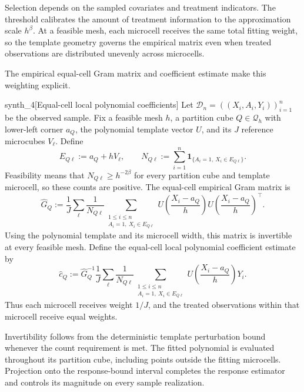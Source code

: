 Selection depends on the sampled covariates and treatment indicators. The threshold calibrates the amount of treatment information to the approximation scale \(h^\beta\). At a feasible mesh, each microcell receives the same total fitting weight, so the template geometry governs the empirical matrix even when treated observations are distributed unevenly across microcells.

The empirical equal-cell Gram matrix  and coefficient estimate  make this weighting explicit.

\begin{definitionv}{synth_4}[Equal-cell local polynomial coefficients]
Let \(\mathcal D_n=((X_i,A_i,Y_i))_{i=1}^n\) be the observed sample. Fix a feasible mesh \(h\), a partition cube \(Q\in\mathcal Q_h\) with lower-left corner \(a_Q\), the polynomial template vector \(U\), and its \(J\) reference microcubes \(V_\ell\). Define
\[
E_{Q\ell}:=a_Q+hV_\ell,
\qquad
N_{Q\ell}:=\sum_{i=1}^n
\mathbf 1_{\{A_i=1,\ X_i\in E_{Q\ell}\}}.
\]
Feasibility means that \(N_{Q\ell}\ge h^{-2\beta}\) for every partition cube and template microcell, so these counts are positive. The equal-cell empirical Gram matrix is
\[
\widehat G_Q:=
\frac1J\sum_\ell\frac1{N_{Q\ell}}
\sum_{\substack{1\le i\le n\\ A_i=1,\ X_i\in E_{Q\ell}}}
U\!\left(\frac{X_i-a_Q}{h}\right)
U\!\left(\frac{X_i-a_Q}{h}\right)^\top.
\]
Using the polynomial template and its microcell width, this matrix is invertible at every feasible mesh. Define the equal-cell local polynomial coefficient estimate by
\[
\widehat c_Q:=
\widehat G_Q^{-1}
\frac1J\sum_\ell\frac1{N_{Q\ell}}
\sum_{\substack{1\le i\le n\\ A_i=1,\ X_i\in E_{Q\ell}}}
U\!\left(\frac{X_i-a_Q}{h}\right)Y_i.
\]
Thus each microcell receives weight \(1/J\), and the treated observations within that microcell receive equal weights.
\end{definitionv}

Invertibility follows from the deterministic template perturbation bound whenever the count requirement is met. The fitted polynomial is evaluated throughout its partition cube, including points outside the fitting microcells. Projection onto the response-bound interval completes the response estimator  and controls its magnitude on every sample realization.

